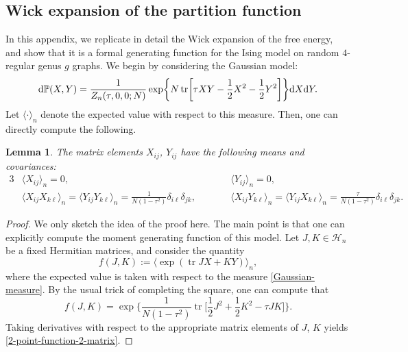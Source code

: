 \documentclass[10pt,a4paper]{amsart}
\DeclareMathOperator{\tr}{tr}
\numberwithin{equation}{section}
\newtheorem{Lemma}[Theorem]{Lemma}
\begin{document}
\subsection{Wick expansion of the partition function}\label{Genus0-A}
In this appendix, we replicate in detail the Wick expansion of the free energy, and show that it
is a formal generating function for the Ising model on random $4$-regular genus $g$ graphs.
We begin by considering the Gaussian model:
 \begin{equation}\label{Gaussian-measure}
 {\rm d}\mathbb{P}(X,Y) = \frac{1}{Z_n(\tau,0,0;N)}\exp \biggl\{N\tr\biggl[\tau XY - \frac{1}{2}X^2 -\frac{1}{2}Y^2\biggr]\biggr\} {\rm d}X{\rm d}Y.
 \end{equation}
Let $\langle\cdot\rangle_n$ denote the expected value with respect to this measure. Then, one can directly compute the following.
\begin{Lemma}The matrix elements $X_{ij}$, $Y_{ij}$
have the following means and covariances:
 \begin{alignat}{3}
 &\langle X_{ij} \rangle_n = 0, && \langle Y_{ij} \rangle_n = 0,&\label{2-point-function-2-matrix}\\
 &\langle X_{ij}X_{k\ell}\rangle_n = \langle Y_{ij}Y_{k\ell}\rangle_n = \frac{1}{N(1-\tau^2)} \delta_{i\ell}\delta_{jk},\qquad &&
 \langle X_{ij}Y_{k\ell}\rangle_n =\langle Y_{ij}X_{k\ell}\rangle_n = \frac{\tau}{N(1-\tau^2)} \delta_{i\ell}\delta_{jk}.&\nonumber
 \end{alignat}
\end{Lemma}
\begin{proof}
 We only sketch the idea of the proof here. The main point is that one can explicitly compute the moment generating function of this model.
 Let $J, K \in \mathcal{H}_n$ be a fixed Hermitian matrices, and consider the quantity
 \begin{equation*}
 f(J, K) := \langle \exp (\tr J X + K Y) \rangle_n,
 \end{equation*}
 where the expected value is taken with respect to the measure \eqref{Gaussian-measure}. By the usual trick of completing the square, one can compute that
 \begin{equation*}
 f(J,K) = \exp\biggl\{\frac{1}{N(1-\tau^2)}\tr\biggl[\frac{1}{2}J^2 + \frac{1}{2}K^2 -\tau JK\biggr]\biggr\}.
 \end{equation*}
 Taking derivatives with respect to the appropriate matrix elements of $J$, $K$ yields \eqref{2-point-function-2-matrix}.
\end{proof}
\end{document}
